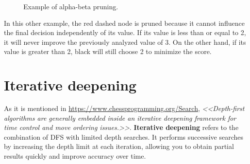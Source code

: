 \begin{figure}[H]
    \centering
    \caption{Example of alpha-beta pruning.}
    \label{fig:alpha-beta-pruning}
\end{figure}

In this other example, the red dashed node is pruned because it cannot influence the final decision independently of its value. If its value is less than or equal to 2, it will never improve the previously analyzed value of 3. On the other hand, if its value is greater than 2, black will still choose 2 to minimize the score.

\section{Iterative deepening}

As it is mentioned in \url{https://www.chessprogramming.org/Search}, \textit{<<Depth-first algorithms are generally embedded inside an iterative deepening framework for time control and move ordering issues.>>}. \textbf{Iterative deepening} refers to the combination of DFS with limited depth searches. It performs successive searches by increasing the depth limit at each iteration, allowing you to obtain partial results quickly and improve accuracy over time.


